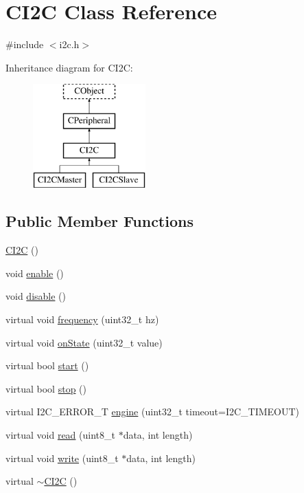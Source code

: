 \hypertarget{class_c_i2_c}{\section{C\-I2\-C Class Reference}
\label{class_c_i2_c}
}


{\ttfamily \#include $<$i2c.\-h$>$}

Inheritance diagram for C\-I2\-C\-:\begin{figure}[H]
\begin{center}
\leavevmode
\includegraphics[height=4.000000cm]{d0/dce/class_c_i2_c}
\end{center}
\end{figure}
\subsection*{Public Member Functions}
\begin{DoxyCompactItemize}
\item 
\hyperlink{class_c_i2_c_a2df83a2627a8b8bf91460a68372c9ed5}{C\-I2\-C} ()
\item 
void \hyperlink{class_c_i2_c_aeff3f958457f68d453fe125b031c4539}{enable} ()
\item 
void \hyperlink{class_c_i2_c_a36a89b063ac68ff1710193258e76ea73}{disable} ()
\item 
virtual void \hyperlink{class_c_i2_c_ab5158b0fe99495c186200ac1d6ef4e52}{frequency} (uint32\-\_\-t hz)
\item 
virtual void \hyperlink{class_c_i2_c_a20801c3b9529bb0b3b29d51630a399de}{on\-State} (uint32\-\_\-t value)
\item 
virtual bool \hyperlink{class_c_i2_c_a1517b47af85f0129355d2242f124dfbc}{start} ()
\item 
virtual bool \hyperlink{class_c_i2_c_a68800b62b81e6fb291c24db5e0618e56}{stop} ()
\item 
virtual I2\-C\-\_\-\-E\-R\-R\-O\-R\-\_\-\-T \hyperlink{class_c_i2_c_ab0776700fc48c94f200774e832081c7f}{engine} (uint32\-\_\-t timeout=I2\-C\-\_\-\-T\-I\-M\-E\-O\-U\-T)
\item 
virtual void \hyperlink{class_c_i2_c_ac1730f4db280cd2c9b0d73a03317776e}{read} (uint8\-\_\-t $\ast$data, int length)
\item 
virtual void \hyperlink{class_c_i2_c_a379c419607c235a7d723ab4391c2ff2c}{write} (uint8\-\_\-t $\ast$data, int length)
\item 
virtual \hyperlink{class_c_i2_c_a1e66eebc5b74b3f79d44e506a6e72810}{$\sim$\-C\-I2\-C} ()
\end{DoxyCompactItemize}
